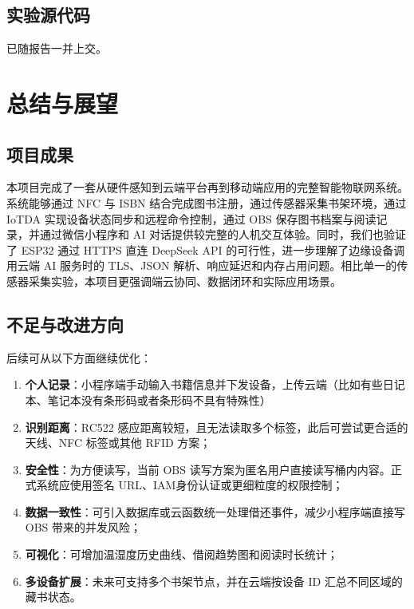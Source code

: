 \documentclass[12pt,hyperref,a4paper,UTF8]{ctexart}
\begin{document}
\subsection{实验源代码}

已随报告一并上交。


\section{总结与展望}

\subsection{项目成果}

本项目完成了一套从硬件感知到云端平台再到移动端应用的完整智能物联网系统。系统能够通过 NFC 与 ISBN 结合完成图书注册，通过传感器采集书架环境，通过 IoTDA 实现设备状态同步和远程命令控制，通过 OBS 保存图书档案与阅读记录，并通过微信小程序和 AI 对话提供较完整的人机交互体验。同时，我们也验证了 ESP32 通过 HTTPS 直连 DeepSeek API 的可行性，进一步理解了边缘设备调用云端 AI 服务时的 TLS、JSON 解析、响应延迟和内存占用问题。相比单一的传感器采集实验，本项目更强调端云协同、数据闭环和实际应用场景。

\subsection{不足与改进方向}

后续可从以下方面继续优化：

\begin{enumerate}
    \item \textbf{个人记录}：小程序端手动输入书籍信息并下发设备，上传云端（比如有些日记本、笔记本没有条形码或者条形码不具有特殊性）
    \item \textbf{识别距离}：RC522 感应距离较短，且无法读取多个标签，此后可尝试更合适的天线、NFC 标签或其他 RFID 方案；
    \item \textbf{安全性}：为方便读写，当前 OBS 读写方案为匿名用户直接读写桶内内容。正式系统应使用签名 URL、IAM身份认证或更细粒度的权限控制；
    \item \textbf{数据一致性}：可引入数据库或云函数统一处理借还事件，减少小程序端直接写 OBS 带来的并发风险；
    \item \textbf{可视化}：可增加温湿度历史曲线、借阅趋势图和阅读时长统计；
    \item \textbf{多设备扩展}：未来可支持多个书架节点，并在云端按设备 ID 汇总不同区域的藏书状态。
\end{enumerate}
\end{document}
